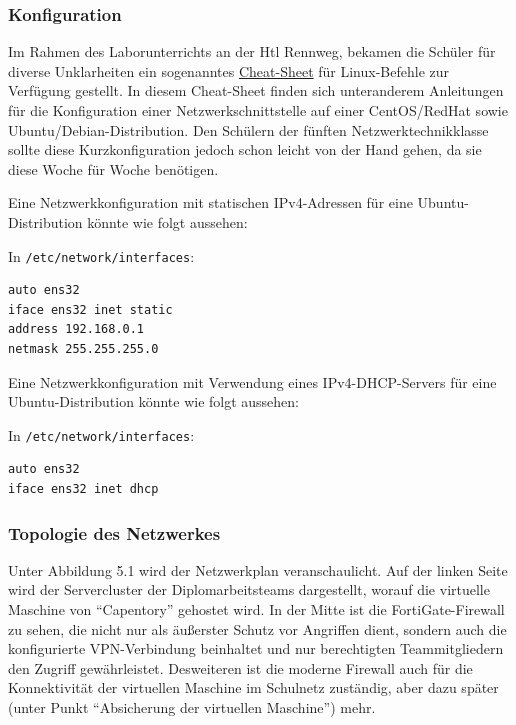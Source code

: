\hypertarget{konfiguration}{%
\subsubsection{Konfiguration}\label{konfiguration}}

Im Rahmen des Laborunterrichts an der Htl Rennweg, bekamen die Schüler
für diverse Unklarheiten ein sogenanntes
\href{https://netzwerktechnik.htl.rennweg.at/~zai/Fachschule/NWT_Stamm_Foerderkurs/Survival_Guide_Linux_Network_Configuration.pdf}{Cheat-Sheet}
für Linux-Befehle zur Verfügung gestellt. In diesem Cheat-Sheet finden
sich unteranderem Anleitungen für die Konfiguration einer
Netzwerkschnittstelle auf einer CentOS/RedHat sowie
Ubuntu/Debian-Distribution. Den Schülern der fünften
Netzwerktechnikklasse sollte diese Kurzkonfiguration jedoch schon leicht
von der Hand gehen, da sie diese Woche für Woche benötigen.

Eine Netzwerkkonfiguration mit statischen IPv4-Adressen für eine
Ubuntu-Distribution könnte wie folgt aussehen:

In \texttt{/etc/network/interfaces}:

\begin{verbatim}
auto ens32
iface ens32 inet static
address 192.168.0.1
netmask 255.255.255.0
\end{verbatim}

Eine Netzwerkkonfiguration mit Verwendung eines IPv4-DHCP-Servers für
eine Ubuntu-Distribution könnte wie folgt aussehen:

In \texttt{/etc/network/interfaces}:

\begin{verbatim}
auto ens32
iface ens32 inet dhcp
\end{verbatim}

\hypertarget{topologie-des-netzwerkes}{%
\subsubsection{Topologie des
Netzwerkes}\label{topologie-des-netzwerkes}}

Unter Abbildung 5.1 wird der Netzwerkplan veranschaulicht. Auf der
linken Seite wird der Servercluster der Diplomarbeitsteams dargestellt,
worauf die virtuelle Maschine von ``Capentory'' gehostet wird. In der
Mitte ist die FortiGate-Firewall zu sehen, die nicht nur als äußerster
Schutz vor Angriffen dient, sondern auch die konfigurierte
VPN-Verbindung beinhaltet und nur berechtigten Teammitgliedern den
Zugriff gewährleistet. Desweiteren ist die moderne Firewall auch für die
Konnektivität der virtuellen Maschine im Schulnetz zuständig, aber dazu
später (unter Punkt ``Absicherung der virtuellen Maschine'') mehr.

